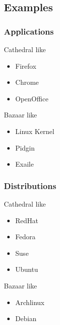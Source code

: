 \documentclass[hyperref={pdfpagelabels=false},xcolor=pst,pdf,fragile]{beamer}
\begin{document}
\subsection{Examples}

%
%

\begin{frame}
  \frametitle{Applications}

  \begin{block}{Cathedral like}
	\begin{itemize}
	  \item Firefox
	  \item Chrome
	  \item OpenOffice
	\end{itemize}
  \end{block}

  \begin{block}{Bazaar like}
	\begin{itemize}
	  \item Linux Kernel
	  \item Pidgin
	  \item Exaile
	\end{itemize}
  \end{block}

\end{frame}

\begin{frame}
  \frametitle{Distributions}

  \begin{block}{Cathedral like}
	\begin{itemize}
	  \item RedHat
	  \item Fedora
	  \item Suse
	  \item Ubuntu
	\end{itemize}
  \end{block}

  \begin{block}{Bazaar like}
	\begin{itemize}
	  \item Archlinux
	  \item Debian
	\end{itemize}
  \end{block}

\end{frame}
\end{document}
